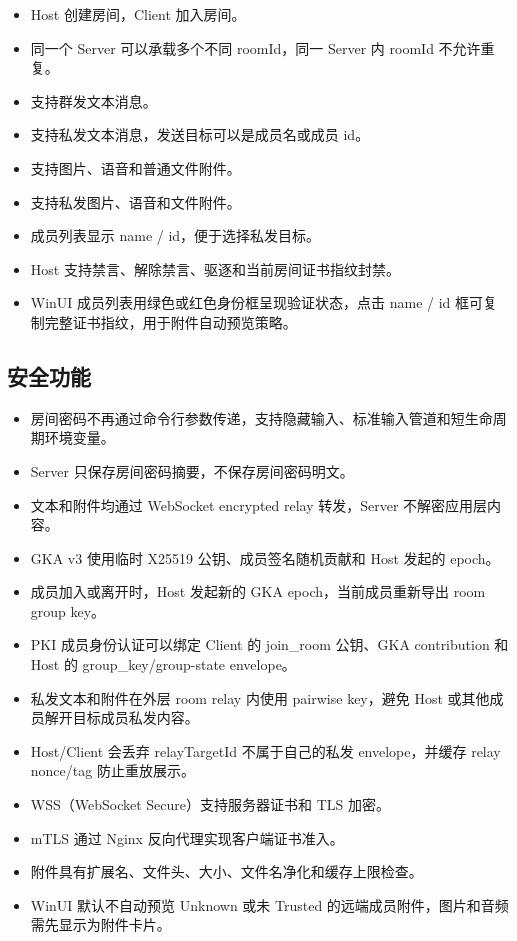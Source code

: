 \documentclass[UTF8,a4paper,12pt]{ctexart}
\begin{document}
\begin{itemize}
  \item Host 创建房间，Client 加入房间。
  \item 同一个 Server 可以承载多个不同 roomId，同一 Server 内 roomId 不允许重复。
  \item 支持群发文本消息。
  \item 支持私发文本消息，发送目标可以是成员名或成员 id。
  \item 支持图片、语音和普通文件附件。
  \item 支持私发图片、语音和文件附件。
  \item 成员列表显示 name / id，便于选择私发目标。
  \item Host 支持禁言、解除禁言、驱逐和当前房间证书指纹封禁。
  \item WinUI 成员列表用绿色或红色身份框呈现验证状态，点击 name / id 框可复制完整证书指纹，用于附件自动预览策略。
\end{itemize}

\subsection{安全功能}

\begin{itemize}
  \item 房间密码不再通过命令行参数传递，支持隐藏输入、标准输入管道和短生命周期环境变量。
  \item Server 只保存房间密码摘要，不保存房间密码明文。
  \item 文本和附件均通过 WebSocket encrypted relay 转发，Server 不解密应用层内容。
  \item GKA v3 使用临时 X25519 公钥、成员签名随机贡献和 Host 发起的 epoch。
  \item 成员加入或离开时，Host 发起新的 GKA epoch，当前成员重新导出 room group key。
  \item PKI 成员身份认证可以绑定 Client 的 join\_room 公钥、GKA contribution 和 Host 的 group\_key/group-state envelope。
  \item 私发文本和附件在外层 room relay 内使用 pairwise key，避免 Host 或其他成员解开目标成员私发内容。
  \item Host/Client 会丢弃 relayTargetId 不属于自己的私发 envelope，并缓存 relay nonce/tag 防止重放展示。
  \item WSS（WebSocket Secure）支持服务器证书和 TLS 加密。
  \item mTLS 通过 Nginx 反向代理实现客户端证书准入。
  \item 附件具有扩展名、文件头、大小、文件名净化和缓存上限检查。
  \item WinUI 默认不自动预览 Unknown 或未 Trusted 的远端成员附件，图片和音频需先显示为附件卡片。
\end{itemize}
\end{document}
